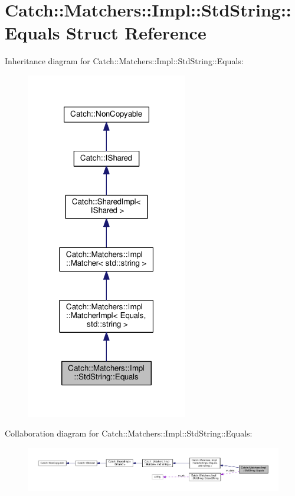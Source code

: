 \hypertarget{structCatch_1_1Matchers_1_1Impl_1_1StdString_1_1Equals}{}\section{Catch\+:\+:Matchers\+:\+:Impl\+:\+:Std\+String\+:\+:Equals Struct Reference}
\label{structCatch_1_1Matchers_1_1Impl_1_1StdString_1_1Equals}


Inheritance diagram for Catch\+:\+:Matchers\+:\+:Impl\+:\+:Std\+String\+:\+:Equals\+:
\nopagebreak
\begin{figure}[H]
\begin{center}
\leavevmode
\includegraphics[width=199pt]{structCatch_1_1Matchers_1_1Impl_1_1StdString_1_1Equals__inherit__graph}
\end{center}
\end{figure}


Collaboration diagram for Catch\+:\+:Matchers\+:\+:Impl\+:\+:Std\+String\+:\+:Equals\+:
\nopagebreak
\begin{figure}[H]
\begin{center}
\leavevmode
\includegraphics[width=350pt]{structCatch_1_1Matchers_1_1Impl_1_1StdString_1_1Equals__coll__graph}
\end{center}
\end{figure}
